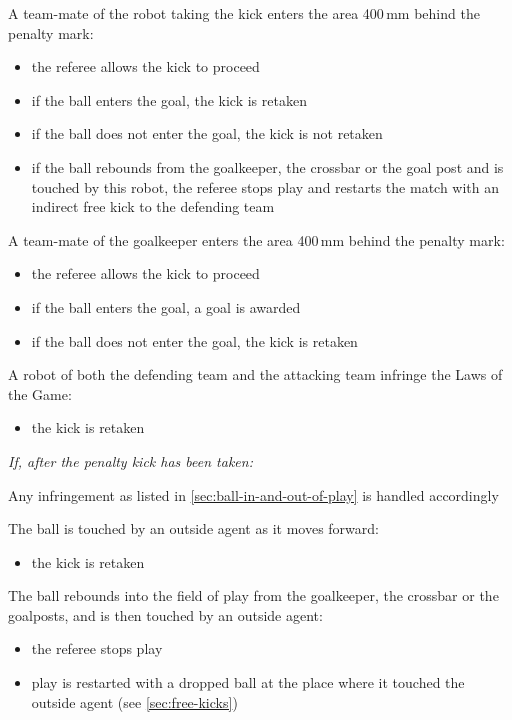 A team-mate of the robot taking the kick enters the area 400\,mm behind the penalty mark:

\begin{itemize}
\item the referee allows the kick to proceed
\item if the ball enters the goal, the kick is retaken
\item if the ball does not enter the goal, the kick is not retaken
\item if the ball rebounds from the goalkeeper, the crossbar or the goal post and is touched by this robot, the referee stops play and restarts the match with an indirect free kick to the defending team
\end{itemize}

A team-mate of the goalkeeper enters the area 400\,mm behind the penalty mark:

\begin{itemize}
\item the referee allows the kick to proceed
\item if the ball enters the goal, a goal is awarded
\item if the ball does not enter the goal, the kick is retaken
\end{itemize}

A robot of both the defending team and the attacking team infringe the Laws of the Game:

\begin{itemize}
\item the kick is retaken
\end{itemize}

\textit{If, after the penalty kick has been taken:}

Any infringement as listed in \autoref{sec:ball-in-and-out-of-play} is handled accordingly

The ball is touched by an outside agent as it moves forward:

\begin{itemize}
\item the kick is retaken
\end{itemize}

The ball rebounds into the field of play from the goalkeeper, the crossbar or the goalposts, and is then touched by an outside agent:

\begin{itemize}
\item the referee stops play
\item play is restarted with a dropped ball at the place where it touched the outside agent (see \autoref{sec:free-kicks})
\end{itemize}
